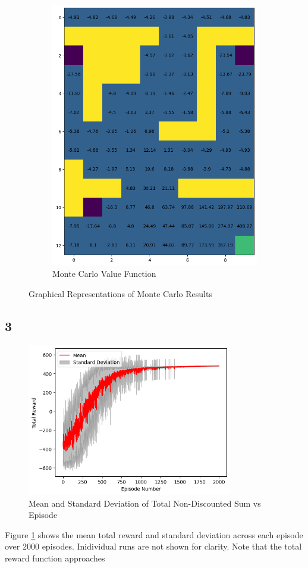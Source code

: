 \begin{figure}[H]
\begin{subfigure}[b]{0.4\textwidth}
        \includegraphics[width=\textwidth]{assets/mc/mc_value.png}        
        \caption{Monte Carlo Value Function}
    \end{subfigure}
    \caption*{Graphical Representations of Monte Carlo Results}
\end{figure} 

\subsection*{3}
\begin{figure}[H]
    \centering
    \includegraphics[width=0.8\textwidth]{assets/mc/mean_std_plot.png}
    \caption{Mean and Standard Deviation of Total Non-Discounted Sum vs Episode}
    \label{figure: total reward vs episode mc}
\end{figure} 

Figure \ref{figure: total reward vs episode mc} shows the mean
total reward and standard deviation across each episode over 2000
episodes. Inidividual runs are not shown for clarity. Note that
the total reward function approaches 

